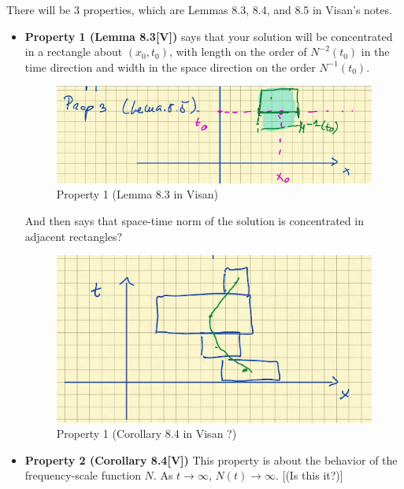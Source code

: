 \documentclass{article}
\def\purple{\color{Purple}}
\newcommand{\pnote}[1]{{\purple [#1]}} %
\begin{document}
There will be 3 properties, which are Lemmas 8.3, 8.4, and 8.5 in Visan's
notes.
\begin{itemize}
  \item \textbf{Property 1 (Lemma 8.3[V])} says that your solution will
  be concentrated in a rectangle about $(x_{0},t_{0})$, with length on the
  order of $N^{-2}(t_{0})$ in the time direction and width in the space
  direction on the order $N^{-1}(t_{0})$.

  \begin{figure}[H]
    \centering \includegraphics[scale=.5]{Visan-Lemma-8.3}
    \caption{Property 1 (Lemma 8.3 in Visan)}
    \label{fig:lem8.3}
  \end{figure}

  And then says that space-time norm of the solution is concentrated in adjacent
  rectangles?
  \begin{center}
    \begin{figure}[H]
      \centering \includegraphics[scale=.5]{Visan-Lemma-8.4}
      \caption{Property 1 (Corollary 8.4 in Visan ?)}
      \label{fig:lem8.4}
    \end{figure}
  \end{center}
  
  \item \textbf{Property 2 (Corollary 8.4[V])} This property is about the
  behavior of the frequency-scale function $N$. As $t\to\infty$,
  $N(t)\to \infty$. \pnote{(Is this it?)}


\end{itemize}
\end{document}
